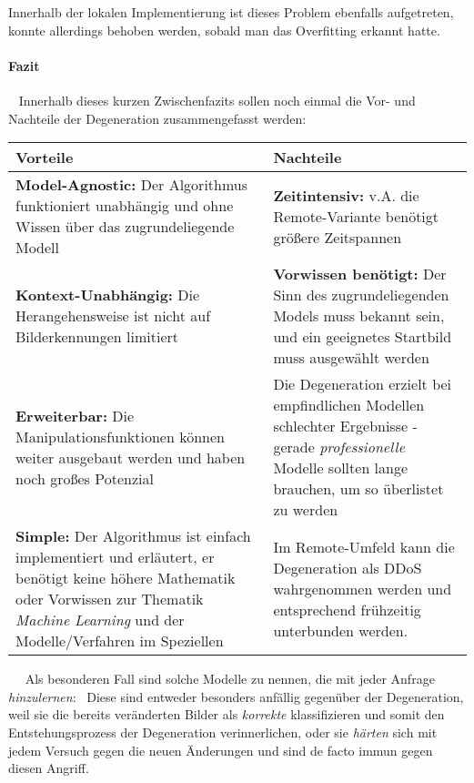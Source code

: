 Innerhalb der lokalen Implementierung ist dieses Problem ebenfalls aufgetreten, konnte allerdings behoben werden, sobald man das Overfitting erkannt hatte.
\newpage 
\paragraph{Fazit} ~\newline
Innerhalb dieses kurzen Zwischenfazits sollen noch einmal die Vor- und Nachteile der Degeneration zusammengefasst werden: ~\newline ~\newline  
\begin{tabular}{|p{7.5cm}|p{7.5cm}|}
	\hline 
	\textbf{Vorteile} & \textbf{Nachteile} \\ 
	\hline 
	\textbf{Model-Agnostic:} \newline Der Algorithmus funktioniert unabhängig und ohne Wissen über das zugrundeliegende Modell & \textbf{Zeitintensiv:} \newline v.A. die Remote-Variante benötigt größere Zeitspannen \\ 
	\hline 
	\textbf{Kontext-Unabhängig:} \newline Die Herangehensweise ist nicht auf Bilderkennungen limitiert & \textbf{Vorwissen benötigt:} \newline Der Sinn des zugrundeliegenden Models muss bekannt sein, und ein geeignetes Startbild muss ausgewählt werden  \\ 
	\hline 
	\textbf{Erweiterbar:} \newline Die Manipulationsfunktionen können weiter ausgebaut werden und haben noch großes Potenzial & Die Degeneration erzielt bei empfindlichen Modellen schlechter Ergebnisse - gerade \textit{professionelle} Modelle sollten lange brauchen, um so überlistet zu werden \\ 
	\hline 
	\textbf{Simple:} \newline Der Algorithmus ist einfach implementiert und erläutert, er benötigt keine höhere Mathematik oder Vorwissen zur Thematik \textit{Machine Learning} und der Modelle/Verfahren im Speziellen & Im Remote-Umfeld kann die Degeneration als DDoS wahrgenommen werden und entsprechend frühzeitig unterbunden werden. \\ 
	\hline 
\end{tabular}  ~\newline ~\newline
Als besonderen Fall sind solche Modelle zu nennen, die mit jeder Anfrage \textit{hinzulernen}: ~\newline Diese sind entweder besonders anfällig gegenüber der Degeneration, weil sie die bereits veränderten Bilder als \textit{korrekte} klassifizieren und somit den Entstehungsprozess der Degeneration verinnerlichen, oder sie \textit{härten} sich mit jedem Versuch gegen die neuen Änderungen und sind de facto immun gegen diesen Angriff.  


